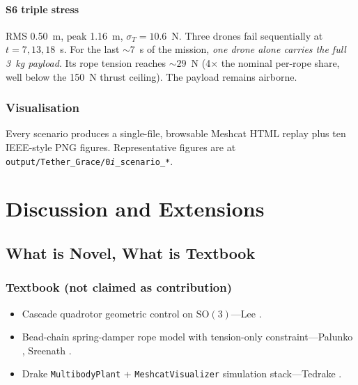 \documentclass[11pt,a4paper,oneside]{report}
\newcommand{\SO}{\mathrm{SO}}
\begin{document}
\subsection{S6 triple stress}
RMS 0.50~m, peak 1.16~m, $\sigma_T=10.6$~N. Three drones fail
sequentially at $t=7,13,18$~s. For the last $\sim 7$~s of the
mission, \emph{one drone alone carries the full 3~kg payload}. Its
rope tension reaches $\sim 29$~N (4$\times$ the nominal per-rope
share, well below the 150~N thrust ceiling). The payload remains
airborne.

\section{Visualisation}
Every scenario produces a single-file, browsable Meshcat HTML replay
plus ten IEEE-style PNG figures. Representative figures are at
\texttt{output/Tether\_Grace/0\emph{i}\_scenario\_*}.

\part{Discussion and Extensions}

\chapter{What is Novel, What is Textbook}
\label{chap:discussion}

\section{Textbook (not claimed as contribution)}
\begin{itemize}
\item Cascade quadrotor geometric control on $\SO(3)$---Lee
\cite{Lee2010}.
\item Bead-chain spring-damper rope model with tension-only
constraint---Palunko \cite{Palunko2012}, Sreenath \cite{Sreenath2013}.
\item Drake \texttt{MultibodyPlant} + \texttt{MeshcatVisualizer}
simulation stack---Tedrake \cite{Drake}.
\end{itemize}
\end{document}
